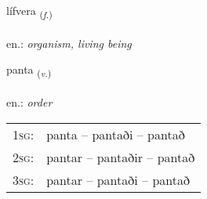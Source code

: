 \documentclass[frontgrid, backgrid]{flacards}\usepackage[]{graphicx}\usepackage[]{xcolor}
\begin{document}
\renewcommand{\flhead}{\vskip5pt \fboxsep=0pt {\small\bfseries\footnotesize Nafnorð | Noun}}
\renewcommand{\fcfoot}{\vskip5pt \fboxsep=0pt \hspace{2pt}{\small\bfseries\footnotesize 2K}}

\renewcommand{\blhead}{\vskip5pt {\small\bfseries\footnotesize Nafnorð | Noun }}
\renewcommand{\bcfoot}{\vskip5pt \hspace{2pt}{\small\bfseries\footnotesize 2K}}


{lífvera \small{\textsubscript{(\textit{f.})}} \\[1ex] %
\textphonetic{[livɛra]} \\
en.: \emph{organism, living being} \\  [2ex]
\renewcommand*{\arraystretch}{0.8}
}

\renewcommand{\flhead}{\vskip5pt \fboxsep=0pt {\small\bfseries\footnotesize Sagnorð | Verb}}
\renewcommand{\fcfoot}{\vskip5pt \fboxsep=0pt \hspace{2pt}{\small\bfseries\footnotesize 2K}}

\renewcommand{\blhead}{\vskip5pt {\small\bfseries\footnotesize Sagnorð | Verb }}
\renewcommand{\bcfoot}{\vskip5pt \hspace{2pt}{\small\bfseries\footnotesize 2K}}


{panta \small{\textsubscript{(\textit{v.})}} \\[1ex] %
\textphonetic{[pʰan̥ta]} \\
en.: \emph{order} \\  [2ex]
\renewcommand*{\arraystretch}{0.8}
\begin{tabular}{p{1cm}l}
\textsc{1sg}: & panta -- pantaði -- pantað \\ 
\textsc{2sg}: & pantar -- pantaðir -- pantað \\ 
\textsc{3sg}: & pantar -- pantaði -- pantað \\ 
\end{tabular}
}
\end{document}
